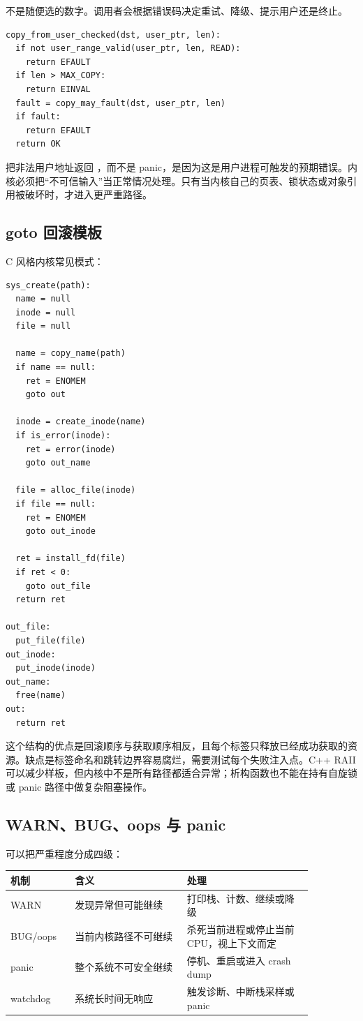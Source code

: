  不是随便选的数字。调用者会根据错误码决定重试、降级、提示用户还是终止。

\begin{lstlisting}
copy_from_user_checked(dst, user_ptr, len):
  if not user_range_valid(user_ptr, len, READ):
    return EFAULT
  if len > MAX_COPY:
    return EINVAL
  fault = copy_may_fault(dst, user_ptr, len)
  if fault:
    return EFAULT
  return OK
\end{lstlisting}

把非法用户地址返回 ，而不是 panic，是因为这是用户进程可触发的预期错误。内核必须把“不可信输入”当正常情况处理。只有当内核自己的页表、锁状态或对象引用被破坏时，才进入更严重路径。

\subsection{goto 回滚模板}

C 风格内核常见模式：

\begin{lstlisting}
sys_create(path):
  name = null
  inode = null
  file = null

  name = copy_name(path)
  if name == null:
    ret = ENOMEM
    goto out

  inode = create_inode(name)
  if is_error(inode):
    ret = error(inode)
    goto out_name

  file = alloc_file(inode)
  if file == null:
    ret = ENOMEM
    goto out_inode

  ret = install_fd(file)
  if ret < 0:
    goto out_file
  return ret

out_file:
  put_file(file)
out_inode:
  put_inode(inode)
out_name:
  free(name)
out:
  return ret
\end{lstlisting}

这个结构的优点是回滚顺序与获取顺序相反，且每个标签只释放已经成功获取的资源。缺点是标签命名和跳转边界容易腐烂，需要测试每个失败注入点。C++ RAII 可以减少样板，但内核中不是所有路径都适合异常；析构函数也不能在持有自旋锁或 panic 路径中做复杂阻塞操作。

\subsection{WARN、BUG、oops 与 panic}

可以把严重程度分成四级：

\begin{longtable}{|L{0.18\linewidth}|L{0.32\linewidth}|L{0.36\linewidth}|}
\toprule
机制 & 含义 & 处理 \\
\midrule
WARN & 发现异常但可能继续 & 打印栈、计数、继续或降级 \\\tablerowrule
BUG/oops & 当前内核路径不可继续 & 杀死当前进程或停止当前 CPU，视上下文而定 \\\tablerowrule
panic & 整个系统不可安全继续 & 停机、重启或进入 crash dump \\\tablerowrule
watchdog & 系统长时间无响应 & 触发诊断、中断栈采样或 panic \\
\bottomrule
\end{longtable}

